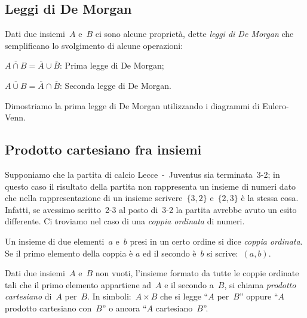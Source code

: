 {%

\subsection{Leggi di De Morgan}
\label{subsec:op_demorgan}

Dati due insiemi~$A$ e~$B$ ci sono alcune proprietà,
dette \emph{leggi di De Morgan} che semplificano lo svolgimento di alcune 
operazioni:


\begin{enumeratea}
\item $\overline{{A\cap B}}=\overline{A}\cup \overline{B}$: 
Prima legge di De Morgan;
\item $\overline{{A\cup B}}=\overline{A}\cap \overline{B}$: 
Seconda legge di De Morgan.
\end{enumeratea}

Dimostriamo la prima legge di De Morgan utilizzando i diagrammi di Eulero-Venn.
\begin{center}
 
\end{center}


\subsection{Prodotto cartesiano fra insiemi}
\label{subsec:op_cartesiano}

Supponiamo che la partita di calcio Lecce~-~Juventus sia terminata~3-2; 
in questo caso il risultato della partita non rappresenta un insieme di 
numeri dato che nella rappresentazione di un insieme 
scrivere~$\{3,2\}$ e~$\{2,3\}$ è la stessa cosa. 
Infatti, se avessimo scritto~2-3 al posto di~3-2 la partita avrebbe avuto un 
esito differente. Ci troviamo nel caso di una \emph{coppia ordinata} di numeri.

\begin{definizione}
Un insieme di due elementi~$a$ e~$b$
presi in un certo ordine si dice \emph{coppia ordinata}. Se il primo elemento 
della coppia è $a$ ed il secondo è~$b$ si scrive:~$(a,b)$.
\end{definizione}


\begin{definizione}
Dati due insiemi~$A$ e~$B$ non vuoti,
l'insieme formato da tutte le coppie ordinate tali che
il primo elemento appartiene ad~$A$ e il secondo a~$B$, si chiama
\emph{prodotto cartesiano} di~$A$ per~$B$. In simboli:~$A\times B$ che si 
legge ``$A$ per~$B$''
oppure ``$A$ prodotto cartesiano con~$B$'' o ancora ``$A$ cartesiano~$B$''.
\end{definizione}

}
